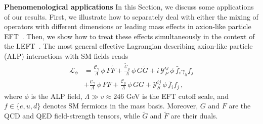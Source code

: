 \documentclass[prl,twocolumn,twoside,preprintnumbers,superscriptaddress, nofootinbib]{revtex4-2}
\begin{document}
{\bf Phenomenological applications} 
In this Section, we discuss some applications of our results. First, we illustrate how to separately deal with either the mixing of operators with different dimensions or leading mass effects in axion-like particle EFT~\cite{Bauer:2020jbp,Chala:2020wvs,DiLuzio:2020oah}. 
Then, we show how to treat these effects simultaneously 
in the context of the LEFT~\cite{Jenkins:2017dyc}.
The most general effective Lagrangian describing 
axion-like particle (ALP) interactions with SM fields reads~\cite{Georgi:1986df,Marciano:2016yhf,DiLuzio:2020oah}
%
\begin{align}
    \mathcal{L}_\phi &= 
    \frac{\tilde{\mathcal{C}}_\gamma}{\Lambda}\,\phi\, F\tilde{F}
    + \frac{\tilde{\mathcal{C}}_g}{\Lambda}\,\phi\, G\tilde{G} 
    + i\, \mathcal{Y}^{ij}_P\,\phi\, \bar{f}_i \gamma_5 f_j 
    \nonumber\\
    & + \frac{\mathcal{C}_\gamma}{\Lambda}\,\phi\, FF
    + \frac{\mathcal{C}_g}{\Lambda}\,\phi\, GG 
    + \mathcal{Y}^{ij}_S\,\phi\, \bar{f}_i f_j \, ,
\end{align}
%
where $\phi$ is the ALP field, $\Lambda \gg v \approx 246$ GeV is the EFT cutoff scale, and $f\in \{e,u,d\}$ denotes SM fermions in the mass basis. Moreover, $G$ and $F$ are the QCD and QED field-strength tensors, while $\tilde{G}$ and $\tilde{F}$ are their duals. 
\end{document}
